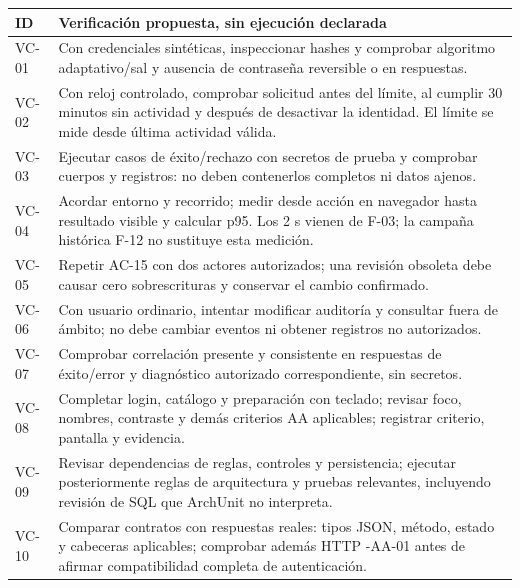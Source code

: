 \documentclass[12pt,a4paper]{report}
\begin{document}
{\def\LTcaptype{none} %
\begin{longtable}[]{@{}
  >{\raggedright\arraybackslash}p{}
  >{\raggedright\arraybackslash}p{}@{}}
\toprule\noalign{}
\begin{minipage}[b]{\linewidth}\raggedright
ID
\end{minipage} & \begin{minipage}[b]{\linewidth}\raggedright
Verificación propuesta, sin ejecución declarada
\end{minipage} \\
\midrule\noalign{}
\endhead
\bottomrule\noalign{}
\endlastfoot
VC-01 & Con credenciales sintéticas, inspeccionar hashes y comprobar
algoritmo adaptativo/sal y ausencia de contraseña reversible o en
respuestas. \\
VC-02 & Con reloj controlado, comprobar solicitud antes del límite,
al cumplir 30 minutos sin actividad y después de desactivar la
identidad. El límite se mide desde última actividad válida. \\
VC-03 & Ejecutar casos de éxito/rechazo con secretos de prueba y
comprobar cuerpos y registros: no deben contenerlos completos ni datos
ajenos. \\
VC-04 & Acordar entorno y recorrido; medir desde acción en navegador
hasta resultado visible y calcular p95. Los 2 s vienen de F-03; la
campaña histórica F-12 no sustituye esta medición. \\
VC-05 & Repetir AC-15 con dos actores autorizados; una revisión
obsoleta debe causar cero sobrescrituras y conservar el cambio
confirmado. \\
VC-06 & Con usuario ordinario, intentar modificar auditoría y
consultar fuera de ámbito; no debe cambiar eventos ni obtener registros
no autorizados. \\
VC-07 & Comprobar correlación presente y consistente en respuestas de
éxito/error y diagnóstico autorizado correspondiente, sin secretos. \\
VC-08 & Completar login, catálogo y preparación con teclado; revisar
foco, nombres, contraste y demás criterios AA aplicables; registrar
criterio, pantalla y evidencia. \\
VC-09 & Revisar dependencias de reglas, controles y persistencia;
ejecutar posteriormente reglas de arquitectura y pruebas relevantes,
incluyendo revisión de SQL que ArchUnit no interpreta. \\
VC-10 & Comparar contratos con respuestas reales: tipos JSON, método,
estado y cabeceras aplicables; comprobar además HTTP -AA-01 antes de
afirmar compatibilidad completa de autenticación. \\
\end{longtable}
}
\end{document}
